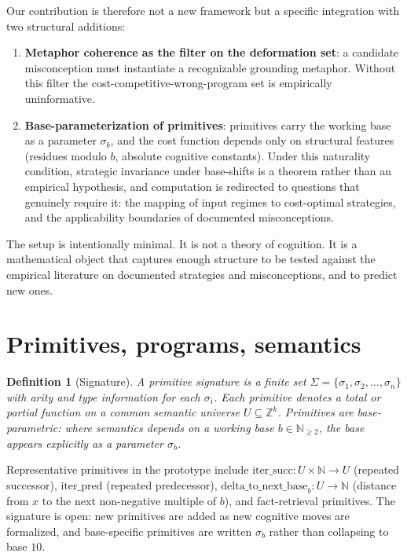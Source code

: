 \documentclass[11pt]{article}
\newtheorem{definition}{Definition}
\begin{document}
Our contribution is therefore not a new framework but a specific
integration with two structural additions:
\begin{enumerate}[noitemsep,topsep=2pt]
  \item \textbf{Metaphor coherence as the filter on the deformation
        set}: a candidate misconception must instantiate a
        recognizable grounding metaphor. Without this filter the
        cost-competitive-wrong-program set is empirically
        uninformative.
  \item \textbf{Base-parameterization of primitives}: primitives carry
        the working base as a parameter $\sigma_b$, and the cost
        function depends only on structural features (residues modulo
        $b$, absolute cognitive constants). Under this naturality
        condition, strategic invariance under base-shifts is a theorem
        rather than an empirical hypothesis, and computation is
        redirected to questions that genuinely require it: the
        mapping of input regimes to cost-optimal strategies, and the
        applicability boundaries of documented misconceptions.
\end{enumerate}

The setup is intentionally minimal. It is not a theory of cognition.
It is a mathematical object that captures enough structure to be tested
against the empirical literature on documented strategies and
misconceptions, and to predict new ones.

\section{Primitives, programs, semantics}

\begin{definition}[Signature]
A \emph{primitive signature} is a finite set $\Sigma = \{\sigma_1,
\sigma_2, \dots, \sigma_n\}$ with arity and type information for each
$\sigma_i$. Each primitive denotes a total or partial function on a
common semantic universe $U \subseteq \mathbb{Z}^k$. Primitives are
\emph{base-parametric}: where semantics depends on a working base
$b \in \mathbb{N}_{\ge 2}$, the base appears explicitly as a parameter
$\sigma_b$.
\end{definition}

Representative primitives in the prototype include
$\mathrm{iter\_succ}: U \times \mathbb{N} \to U$ (repeated successor),
$\mathrm{iter\_pred}$ (repeated predecessor),
$\mathrm{delta\_to\_next\_base}_b: U \to \mathbb{N}$ (distance from
$x$ to the next non-negative multiple of $b$), and fact-retrieval
primitives. The signature is open: new primitives are added as new
cognitive moves are formalized, and base-specific primitives are
written $\sigma_b$ rather than collapsing to base $10$.
\end{document}

